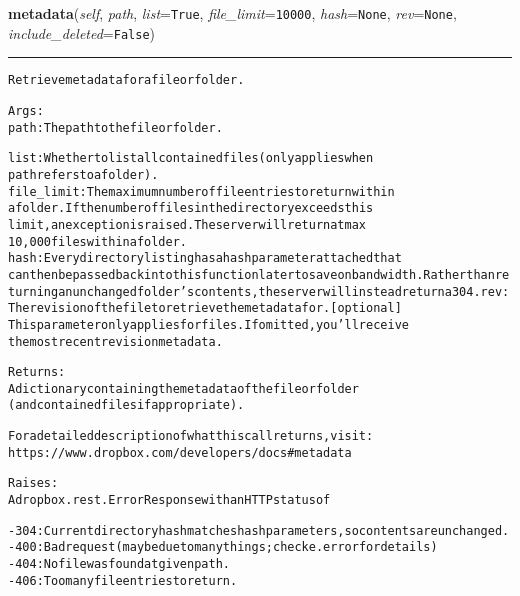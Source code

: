 \hspace{.8\funcindent}\begin{boxedminipage}{\funcwidth}

    \raggedright \textbf{metadata}(\textit{self}, \textit{path}, \textit{list}={\tt True}, \textit{file\_limit}={\tt 10000}, \textit{hash}={\tt None}, \textit{rev}={\tt None}, \textit{include\_deleted}={\tt False})

    \vspace{-1.5ex}

    \rule{\textwidth}{0.5\fboxrule}
\setlength{\parskip}{2ex}
\begin{alltt}
Retrieve metadata for a file or folder.

Args:
    path: The path to the file or folder.

    list: Whether to list all contained files (only applies when
        path refers to a folder).
    file\_limit: The maximum number of file entries to return within
        a folder. If the number of files in the directory exceeds this
        limit, an exception is raised. The server will return at max
        10,000 files within a folder.
    hash: Every directory listing has a hash parameter attached that
        can then be passed back into this function later to save on                bandwidth. Rather than returning an unchanged folder's contents,                the server will instead return a 304.            rev: The revision of the file to retrieve the metadata for. [optional]
        This parameter only applies for files. If omitted, you'll receive
        the most recent revision metadata.

Returns:
    A dictionary containing the metadata of the file or folder
    (and contained files if appropriate).

    For a detailed description of what this call returns, visit:
    https://www.dropbox.com/developers/docs\#metadata

Raises:
    A dropbox.rest.ErrorResponse with an HTTP status of

    - 304: Current directory hash matches hash parameters, so contents are unchanged.
    - 400: Bad request (may be due to many things; check e.error for details)
    - 404: No file was found at given path.
    - 406: Too many file entries to return.
\end{alltt}

\setlength{\parskip}{1ex}
    \end{boxedminipage}

    \label{lib:dropbox:DropboxClient:thumbnail}

